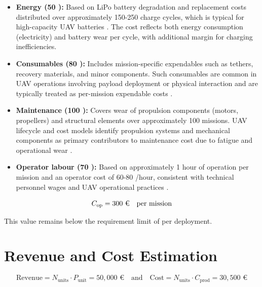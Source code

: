 \begin{itemize}[noitemsep, topsep=2pt]

\item \textbf{Energy (50 \texteuro{}):}  
Based on LiPo battery degradation and replacement costs distributed over approximately 150-250 charge cycles, which is typical for high-capacity UAV batteries \cite{Grepow/Tattu2024TattuBattery, Linden2002HandbookBatteries}. The cost reflects both energy consumption (electricity) and battery wear per cycle, with additional margin for charging inefficiencies.

\item \textbf{Consumables (80 \texteuro{}):}  
Includes mission-specific expendables such as tethers, recovery materials, and minor components. Such consumables are common in UAV operations involving payload deployment or physical interaction and are typically treated as per-mission expendable costs \cite{ValerdiCostVehicles, DronesEASA}.

\item \textbf{Maintenance (100 \texteuro{}):}  
Covers wear of propulsion components (motors, propellers) and structural elements over approximately 100 missions. UAV lifecycle and cost models identify propulsion systems and mechanical components as primary contributors to maintenance cost due to fatigue and operational wear \cite{Thibbotuwawa2019EnergyRouting, ValerdiCostVehicles}.

\item \textbf{Operator labour (70 \texteuro{}):}  
Based on approximately 1 hour of operation per mission and an operator cost of 60-80 \texteuro{}/hour, consistent with technical personnel wages and UAV operational practices \cite{HourlyEurostat, DronesEASA}.

\end{itemize}
\vspace{-10pt}
\begin{equation}
C_{\text{op}} = \text{300 \texteuro{}} \quad \text{per mission}
\end{equation}

This value remains below the requirement limit of \text{500 \texteuro{}} per deployment.

\vspace{-10pt}
\section{Revenue and Cost Estimation}

\begin{equation}
\text{Revenue} = N_{\text{units}} \cdot P_{\text{unit}} = 50{,}000 \text{ €} 
\quad \text{and} \quad 
\text{Cost} = N_{\text{units}} \cdot C_{\text{prod}} = 30{,}500 \text{ €}
\end{equation}


